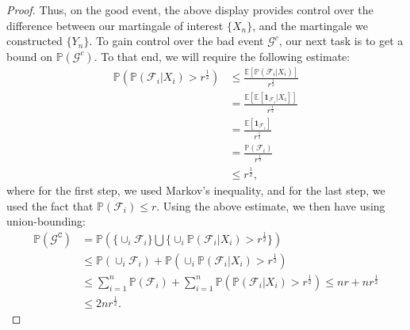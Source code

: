 \documentclass{article}
\newcommand{\mc}{\mathcal}
\begin{document}
\begin{proof}
Thus, on the good event, the above display provides control over the difference between our martingale of interest $\{X_n\}$, and the martingale we constructed $\{Y_n\}$. To gain control over the bad event $\mc{G}^c$, our next task is to get a bound on $\mathbb{P}(\mc{G}^c)$. To that end, we will require the following estimate:
\begin{equation}
\begin{aligned}
\mathbb{P}\left(\mathbb{P}(\mathcal{F}_i \lvert X_i) > r^{\frac{1}{2}}\right) &\leq \frac{\mathbb{E}[
\mathbb{P}(\mathcal{F}_i|X_i)]}{r^{\frac{1}{2}}}\\
&=\frac{\mathbb{E}[
\mathbb{E}[\mathbf{1}_{\mc{F}_i}|X_i]]}{r^{\frac{1}{2}}}\\
&=\frac{
\mathbb{E}[\mathbf{1}_{\mc{F}_i}]}{r^{\frac{1}{2}}}\\
&=\frac{
\mathbb{P}(\mc{F}_i)}{r^{\frac{1}{2}}}\\
&\leq r^{\frac{1}{2}},
\end{aligned}
\label{eqn:AZR_3}
\end{equation}
where for the first step, we used Markov's inequality, and for the last step, we used the fact that $\mathbb{P}(\mc{F}_i) \leq r$. Using the above estimate, we then have using union-bounding:
    \begin{equation}
    \begin{aligned}
        \mathbb{P}(\mathcal{G}^{\texttt{C}}) &= \mathbb{P} \left( \{ \cup_i \mathcal{F}_i\} \bigcup \{\cup_i \mathbb{P}(\mathcal{F}_i \lvert X_i) > r^{\frac{1}{2}}\} \right)\\
        &\le \mathbb{P}(\cup_i \mathcal{F}_i) + \mathbb{P}(\cup_i \mathbb{P}(\mathcal{F}_i \lvert X_i) > r^{\frac{1}{2}}) \\
        & {\leq} \sum_{i=1}^{n} \mathbb{P}(\mathcal{F}_i) + \sum_{i=1}^{n} \mathbb{P}\left(\mathbb{P}(\mathcal{F}_i \lvert X_i) > r^{\frac{1}{2}}\right) \leq n r + n r^{\frac{1}{2}} \\
        & \leq 2nr^{\frac{1}{2}}.
    \end{aligned}
    \end{equation}


\end{proof}
\end{document}
